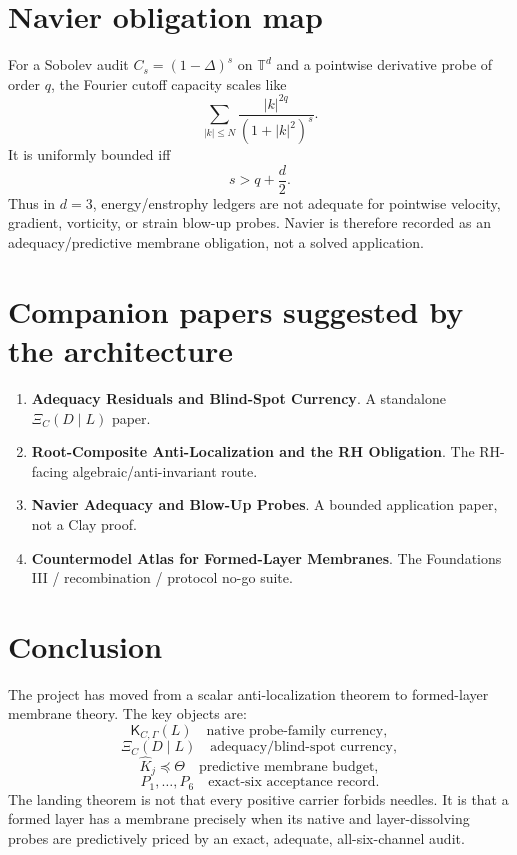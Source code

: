 \documentclass[11pt]{article}
\newcommand{\K}{\mathsf K}
\begin{document}
\section{Navier obligation map}
For a Sobolev audit \(C_s=(1-\Delta)^s\) on \(\mathbb T^d\) and a pointwise derivative probe of order \(q\), the Fourier cutoff capacity scales like
\[
  \sum_{|k|\le N}\frac{|k|^{2q}}{(1+|k|^2)^s}.
\]
It is uniformly bounded iff
\[
  s>q+\frac d2.
\]
Thus in \(d=3\), energy/enstrophy ledgers are not adequate for pointwise velocity, gradient, vorticity, or strain blow-up probes.  Navier is therefore recorded as an adequacy/predictive membrane obligation, not a solved application.

\section{Companion papers suggested by the architecture}
\begin{enumerate}[leftmargin=*]
\item \textbf{Adequacy Residuals and Blind-Spot Currency}.  A standalone \(\Xi_C(D\mid L)\) paper.
\item \textbf{Root-Composite Anti-Localization and the RH Obligation}.  The RH-facing algebraic/anti-invariant route.
\item \textbf{Navier Adequacy and Blow-Up Probes}.  A bounded application paper, not a Clay proof.
\item \textbf{Countermodel Atlas for Formed-Layer Membranes}.  The Foundations III / recombination / protocol no-go suite.
\end{enumerate}

\section{Conclusion}
The project has moved from a scalar anti-localization theorem to formed-layer membrane theory.  The key objects are:
\[
\K_{C,\Gamma}(L)\quad\text{native probe-family currency},
\]
\[
\Xi_C(D\mid L)\quad\text{adequacy/blind-spot currency},
\]
\[
\widehat K_j\preceq\Theta\quad\text{predictive membrane budget},
\]
\[
P_1,\ldots,P_6\quad\text{exact-six acceptance record}.
\]
The landing theorem is not that every positive carrier forbids needles.  It is that a formed layer has a membrane precisely when its native and layer-dissolving probes are predictively priced by an exact, adequate, all-six-channel audit.
\end{document}
